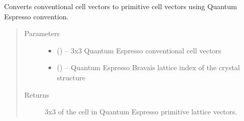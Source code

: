 \documentclass[letterpaper,10pt,english]{sphinxmanual}
\begin{document}

\begin{fulllineitems}
\label{\detokenize{retr:retr.qe_conv2prim}}
Converts conventional cell vectors to primitive cell vectors using Quantum
Espresso convention.
\begin{quote}\begin{description}
\item[{Parameters}] \leavevmode\begin{itemize}
\item {} 
 () -- 3x3 Quantum Espresso conventional cell vectors

\item {} 
 () -- Quantum Espresso Bravais lattice index of the crystal
structure

\end{itemize}

\item[{Returns}] \leavevmode
3x3  of the cell in Quantum Espresso primitive lattice
vectors.

\end{description}\end{quote}

\end{fulllineitems}

\end{document}
